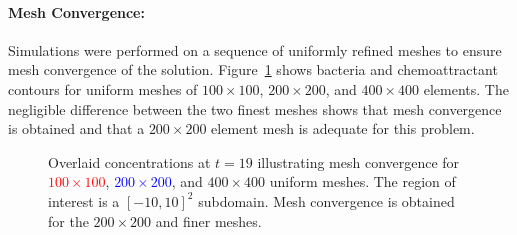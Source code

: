 \paragraph{Mesh Convergence:} Simulations were performed on a sequence of uniformly refined meshes to ensure mesh convergence of the solution.  Figure~\ref{fig:radial_spots_mesh_convergence} shows bacteria and chemoattractant contours for uniform meshes of $100\times 100$, $200\times 200$, and $400\times 400$ elements.  The negligible difference between the two finest meshes shows that mesh convergence is obtained and that a $200\times 200$ element mesh is adequate for this problem.
\begin{figure}[hbtp]
  \begin{center}
    \caption[Overlaid concentrations at $t=19$ on illustrating mesh convergence]{Overlaid concentrations at $t=19$ illustrating mesh convergence for \textcolor{red}{$100\times 100$}, \textcolor{blue}{$200\times 200$}, and $400\times 400$ uniform meshes.  The region of interest is a $[-10,10]^2$ subdomain.  Mesh convergence is obtained for the $200\times 200$ and finer meshes.\label{fig:radial_spots_mesh_convergence}}
  \end{center}
\end{figure}

